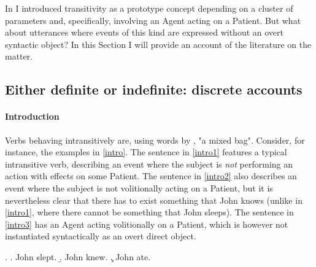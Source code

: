 In  I introduced transitivity as a prototype concept depending on a cluster of parameters and, specifically, involving an Agent acting on a Patient. But what about utterances where events of this kind are expressed without an overt syntactic object? In this Section I will provide an account of the literature on the matter.

\subsection{Either definite or indefinite: discrete accounts} 

\paragraph{Introduction}
Verbs behaving intransitively are, using words by \textcite[191]{rutherford1998workbook}, "a mixed bag". Consider, for instance, the examples in \ref{intro}. The sentence in \ref{intro1} features a typical intransitive verb, describing an event where the subject is \textit{not} performing an action with effects on some Patient. The sentence in \ref{intro2} also describes an event where the subject is not volitionally acting on a Patient, but it is nevertheless clear that there has to exist something that John knows (unlike in \ref{intro1}, where there cannot be something that John sleeps). The sentence in \ref{intro3} has an Agent acting volitionally on a Patient, which is however not instantiated syntactically as an overt direct object.

\ex. \label{intro} \a. \label{intro1} John slept.
\b. \label{intro2} John knew.
\c. \label{intro3} John ate.

